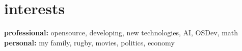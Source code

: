 \documentclass[]{friggeri-cv}
\begin{document}
\section{interests}

\textbf{professional:} opensource, developing, new technologies, AI, OSDev, math \\
\textbf{personal:} my family, rugby, movies, politics, economy
\end{document}
